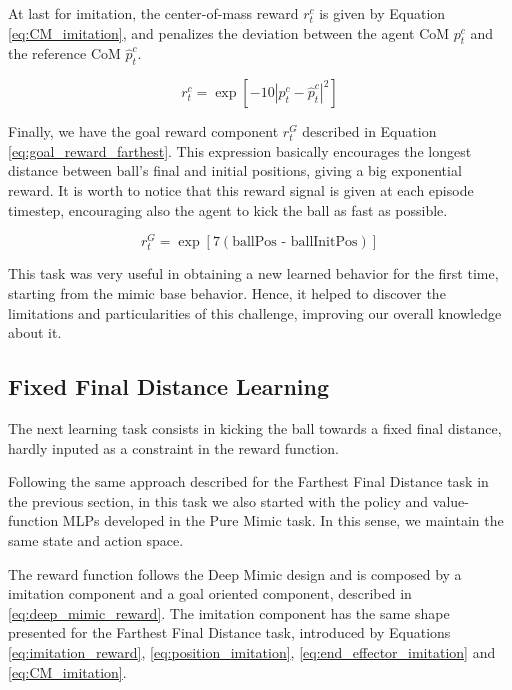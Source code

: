 At last for imitation, the center-of-mass reward $r_t^c$ is given by Equation \eqref{eq:CM_imitation}, and penalizes the deviation between the agent CoM $p_t^c$ and the reference CoM $\hat{p}_t^c$.

\begin{equation}
r^c_t = \exp{ \left[ -10 |p_t^c-\hat{p}_t^c|^2 \right]}
\label{eq:CM_imitation}
\end{equation}

Finally, we have the goal reward component $r_t^G$ described in Equation \eqref{eq:goal_reward_farthest}. This expression basically encourages the longest distance between ball's final and initial positions, giving a big exponential reward. It is worth to notice that this reward signal is given at each episode timestep, encouraging also the agent to kick the ball as fast as possible.

\begin{equation}
r_t^G = \exp{ \left[ 7 (\text{ballPos - ballInitPos}) \right]}
\label{eq:goal_reward_farthest}
\end{equation}

This task was very useful in obtaining a new learned behavior for the first time, starting from the mimic base behavior. Hence, it helped to discover the limitations and particularities of this challenge, improving our overall knowledge about it.

\subsection{Fixed Final Distance Learning}

The next learning task consists in kicking the ball towards a fixed final distance, hardly inputed as a constraint in the reward function.

Following the same approach described for the Farthest Final Distance task in the previous section, in this task we also started with the policy and value-function MLPs developed in the Pure Mimic task. In this sense, we maintain the same state and action space.

The reward function follows the Deep Mimic design and is composed by a imitation component and a goal oriented component, described in \eqref{eq:deep_mimic_reward}. The imitation component has the same shape presented for the Farthest Final Distance task, introduced by Equations \eqref{eq:imitation_reward}, \eqref{eq:position_imitation}, \eqref{eq:end_effector_imitation} and \eqref{eq:CM_imitation}.

